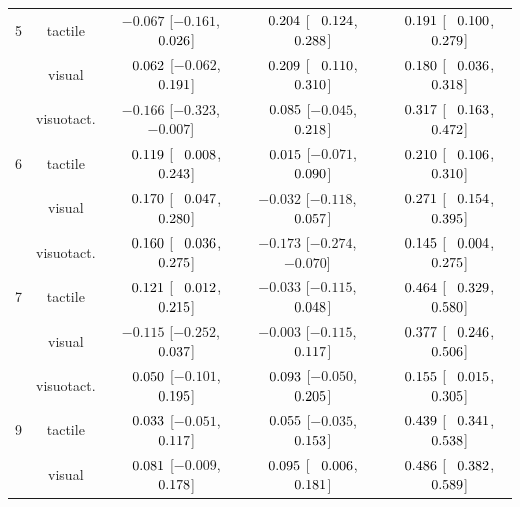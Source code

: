 \begin{longtable}{lcccc}
\midrule
5 & tactile & $-0.067$ [$-0.161$, $\hphantom{-}0.026$] & $\hphantom{-}0.204$ [$\hphantom{-}0.124$, $\hphantom{-}0.288$] & $\hphantom{-}0.191$ [$\hphantom{-}0.100$, $\hphantom{-}0.279$] \\
 & visual & $\hphantom{-}0.062$ [$-0.062$, $\hphantom{-}0.191$] & $\hphantom{-}0.209$ [$\hphantom{-}0.110$, $\hphantom{-}0.310$] & $\hphantom{-}0.180$ [$\hphantom{-}0.036$, $\hphantom{-}0.318$] \\
 & visuotact. & $-0.166$ [$-0.323$, $-0.007$] & $\hphantom{-}0.085$ [$-0.045$, $\hphantom{-}0.218$] & $\hphantom{-}0.317$ [$\hphantom{-}0.163$, $\hphantom{-}0.472$] \\
\midrule
6 & tactile & $\hphantom{-}0.119$ [$\hphantom{-}0.008$, $\hphantom{-}0.243$] & \cellcolor{gray!15}$\hphantom{-}0.015$ [$-0.071$, $\hphantom{-}0.090$] & $\hphantom{-}0.210$ [$\hphantom{-}0.106$, $\hphantom{-}0.310$] \\
 & visual & $\hphantom{-}0.170$ [$\hphantom{-}0.047$, $\hphantom{-}0.280$] & \cellcolor{gray!15}$-0.032$ [$-0.118$, $\hphantom{-}0.057$] & $\hphantom{-}0.271$ [$\hphantom{-}0.154$, $\hphantom{-}0.395$] \\
 & visuotact. & $\hphantom{-}0.160$ [$\hphantom{-}0.036$, $\hphantom{-}0.275$] & \cellcolor{gray!15}$-0.173$ [$-0.274$, $-0.070$] & $\hphantom{-}0.145$ [$\hphantom{-}0.004$, $\hphantom{-}0.275$] \\
\midrule
7 & tactile & \cellcolor{gray!15}$\hphantom{-}0.121$ [$\hphantom{-}0.012$, $\hphantom{-}0.215$] & $-0.033$ [$-0.115$, $\hphantom{-}0.048$] & \cellcolor{gray!15}$\hphantom{-}0.464$ [$\hphantom{-}0.329$, $\hphantom{-}0.580$] \\
 & visual & \cellcolor{gray!15}$-0.115$ [$-0.252$, $\hphantom{-}0.037$] & $-0.003$ [$-0.115$, $\hphantom{-}0.117$] & \cellcolor{gray!15}$\hphantom{-}0.377$ [$\hphantom{-}0.246$, $\hphantom{-}0.506$] \\
 & visuotact. & \cellcolor{gray!15}$\hphantom{-}0.050$ [$-0.101$, $\hphantom{-}0.195$] & $\hphantom{-}0.093$ [$-0.050$, $\hphantom{-}0.205$] & \cellcolor{gray!15}$\hphantom{-}0.155$ [$\hphantom{-}0.015$, $\hphantom{-}0.305$] \\
\midrule
9 & tactile & $\hphantom{-}0.033$ [$-0.051$, $\hphantom{-}0.117$] & $\hphantom{-}0.055$ [$-0.035$, $\hphantom{-}0.153$] & $\hphantom{-}0.439$ [$\hphantom{-}0.341$, $\hphantom{-}0.538$] \\
 & visual & $\hphantom{-}0.081$ [$-0.009$, $\hphantom{-}0.178$] & $\hphantom{-}0.095$ [$\hphantom{-}0.006$, $\hphantom{-}0.181$] & $\hphantom{-}0.486$ [$\hphantom{-}0.382$, $\hphantom{-}0.589$] \\

\end{longtable}
